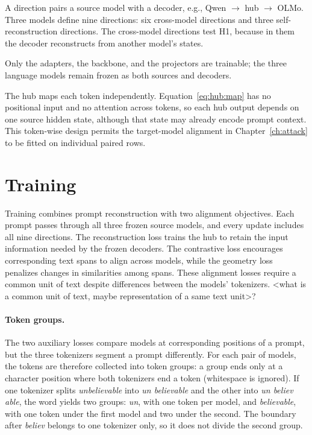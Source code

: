 A direction pairs a source model with a decoder, e.g., Qwen $\to$ hub $\to$ OLMo.
Three models define nine directions: six cross-model directions and three self-reconstruction directions.
The cross-model directions test H1, because in them the decoder reconstructs from another model's states.

Only the adapters, the backbone, and the projectors are trainable; the three language models remain frozen as both sources and decoders.

The hub maps each token independently.
Equation~\ref{eq:hub:map} has no positional input and no attention across tokens, so each hub output depends on one source hidden state, although that state may already encode prompt context.
This token-wise design permits the target-model alignment in Chapter~\ref{ch:attack} to be fitted on individual paired rows.

\section{Training}\label{sec:hub:training}

Training combines prompt reconstruction with two alignment objectives.
Each prompt passes through all three frozen source models, and every update includes all nine directions.
The reconstruction loss trains the hub to retain the input information needed by the frozen decoders.
The contrastive loss encourages corresponding text spans to align across models, while the geometry loss penalizes changes in similarities among spans.
These alignment losses require a common unit of text despite differences between the models' tokenizers. <what is a common unit of text, maybe representation of a same text unit>?


\paragraph{Token groups.} The two auxiliary losses compare models at corresponding positions of a prompt, but the three tokenizers segment a prompt differently.
For each pair of models, the tokens are therefore collected into token groups: a group ends only at a character position where both tokenizers end a token (whitespace is ignored). %
If one tokenizer splits \emph{unbelievable} into \emph{un \textbar{} believable} and the other into \emph{un \textbar{} believ \textbar{} able}, the word yields two groups: \emph{un}, with one token per model, and \emph{believable}, with one token under the first model and two under the second.
The boundary after \emph{believ} belongs to one tokenizer only, so it does not divide the second group.

